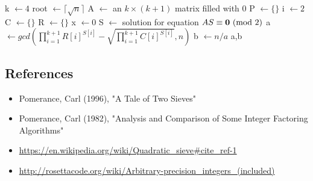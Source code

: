 \documentclass{article}
\begin{document}
\begin{Algorithm}[Quadratic Sieve\label{problem53}][H]
	
    k $\leftarrow 4$ 
    root $\leftarrow \lceil \sqrt{n} \rceil$\;
    A $\leftarrow $ an $k\times (k+1)$ matrix filled with 0\;
    P $\leftarrow \{\}$\;
    i $\leftarrow 2$\;
    C $\leftarrow \{\}$\;
    R $\leftarrow \{\}$\;
    x $\leftarrow 0$\;
    S $\leftarrow$ solution for equation $AS\equiv {\bf 0}\text{ (mod 2)}$\;
    a $\leftarrow gcd(\prod_{i=1}^{k+1}R[i]^{S[i]}-\sqrt{\prod_{i=1}^{k+1}C[i]^{S[i]}},n)$\;
    b $\leftarrow n/a$\;
    \Ret a,b
\end{Algorithm}



\subsection*{References}

\begin{itemize}\itemsep .125cm
	\item Pomerance, Carl (1996), "A Tale of Two Sieves"
	\item Pomerance, Carl (1982), "Analysis and Comparison of Some Integer Factoring Algorithms"
	\item \url{https://en.wikipedia.org/wiki/Quadratic_sieve#cite_ref-1}
	\item \url{http://rosettacode.org/wiki/Arbitrary-precision_integers_(included)}
\end{itemize}

\ifx\onefile\undefined
	
\end{document}
